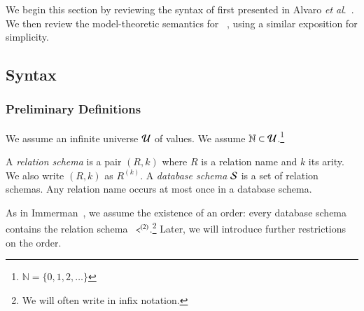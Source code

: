 
We begin this section by reviewing the syntax of \lang first presented
in Alvaro \emph{et al}.~\cite{dedalus}. We then review the model-theoretic semantics for \lang~\cite{ameloot-operational}, using a similar exposition for simplicity.


\subsection{Syntax}

\subsubsection{Preliminary Definitions}


We assume an infinite universe $\univ$ of values.  We assume $\mathbb{N} \subset \univ$.\footnote{$\mathbb{N} = \{0, 1, 2, \ldots\}$}

A {\em relation schema} is a pair $(R,k)$ where $R$ is a relation name and $k$ its arity.  We also write $(R,k)$ as $R^{(k)}$.
A {\em database schema} $\schema$ is a set of relation schemas.  Any relation name occurs at most once in a database schema.

As in Immerman~\cite{immerman-ptime}, we assume
the existence of an order: every database schema contains the relation schema
$\dedalus{<}^{(2)}$.\footnote{We will often write \dedalus{<} in infix notation.}  Later, we will introduce further restrictions on the order.


